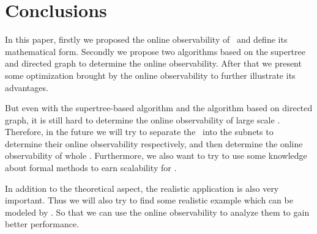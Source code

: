 \section{Conclusions}
\label{sec:con}
In this paper, firstly we proposed the online observability of \BCNs\ and define its mathematical form. Secondly we propose two algorithms based on the supertree and directed graph to determine the online observability. After that we present some optimization brought by the online observability to further illustrate its advantages. 


But even with the supertree-based algorithm and the algorithm based on directed graph, it is still hard to determine the online observability of large scale \BCNs. Therefore, in the future we will try to separate the \BCN\ into the subnets to determine their online observability respectively, and then determine the online observability of whole \BCN. Furthermore, we also want to try to use some knowledge about formal methods to earn scalability for \BCNs. 

In addition to the theoretical aspect, the realistic application is also very important. Thus we will also try to find some realistic example which can be modeled by \BCNs. So that we can use the online observability to analyze them to gain better performance.